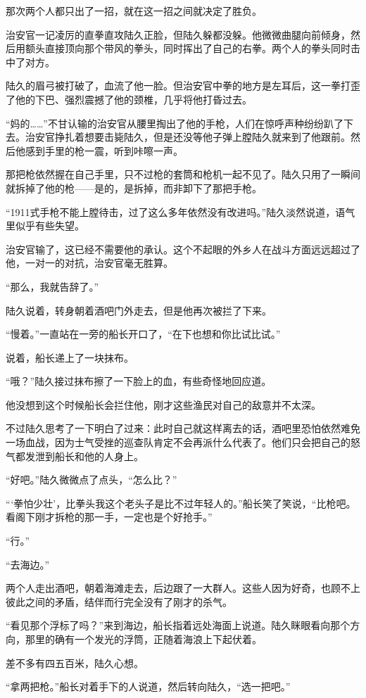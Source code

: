 那次两个人都只出了一招，就在这一招之间就决定了胜负。

治安官一记凌厉的直拳直攻陆久正脸，但陆久躲都没躲。他微微曲腿向前倾身，然后用额头直接顶向那个带风的拳头，同时挥出了自己的右拳。两个人的拳头同时击中了对方。

陆久的眉弓被打破了，血流了他一脸。但治安官中拳的地方是左耳后，这一拳打歪了他的下巴、强烈震撼了他的颈椎，几乎将他打昏过去。

“妈的……”不甘认输的治安官从腰里掏出了他的手枪，人们在惊呼声种纷纷趴了下去。治安官挣扎着想要击毙陆久，但是还没等他子弹上膛陆久就来到了他跟前。然后他感到手里的枪一震，听到咔嚓一声。

那把枪依然握在自己手里，只不过枪的套筒和枪机一起不见了。陆久只用了一瞬间就拆掉了他的枪——是的，是拆掉，而非卸下了那把手枪。

“1911式手枪不能上膛待击，过了这么多年依然没有改进吗。”陆久淡然说道，语气里似乎有些失望。

治安官输了，这已经不需要他的承认。这个不起眼的外乡人在战斗方面远远超过了他，一对一的对抗，治安官毫无胜算。

“那么，我就告辞了。”

陆久说着，转身朝着酒吧门外走去，但是他再次被拦了下来。

“慢着。”一直站在一旁的船长开口了，“在下也想和你比试比试。”

说着，船长递上了一块抹布。

“哦？”陆久接过抹布擦了一下脸上的血，有些奇怪地回应道。

他没想到这个时候船长会拦住他，刚才这些渔民对自己的敌意并不太深。

不过陆久思考了一下明白了过来：此时自己就这样离去的话，酒吧里恐怕依然难免一场血战，因为士气受挫的巡查队肯定不会再派什么代表了。他们只会把自己的怒气都发泄到船长和他的人身上。

“好吧。”陆久微微点了点头，“怎么比？”

“‘拳怕少壮’，比拳头我这个老头子是比不过年轻人的。”船长笑了笑说，“比枪吧。看阁下刚才拆枪的那一手，一定也是个好抢手。”

“行。”

“去海边。”

两个人走出酒吧，朝着海滩走去，后边跟了一大群人。这些人因为好奇，也顾不上彼此之间的矛盾，结伴而行完全没有了刚才的杀气。

“看见那个浮标了吗？”来到海边，船长指着远处海面上说道。陆久眯眼看向那个方向，那里的确有一个发光的浮筒，正随着海浪上下起伏着。

差不多有四五百米，陆久心想。

“拿两把枪。”船长对着手下的人说道，然后转向陆久，“选一把吧。”

